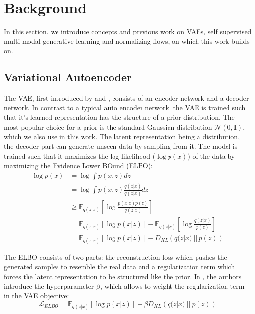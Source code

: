 \section{Background}
In this section, we introduce concepts and previous work on VAEs, self supervised multi modal generative learning and normalizing flows, on which this work builds on.

\subsection{Variational Autoencoder}
The VAE, first introduced by \cite{kingma_auto-encoding_2014} and \cite{rezende_stochastic_2014}, consists of an encoder network and a decoder network.
In contrast to a typical auto encoder network, the VAE is trained such that it's learned representation has the structure of a prior distribution.
The most popular choice for a prior is the standard Gaussian distribution $\mathcal{N}(0,\textbf{I})$, which we also use in this work.
The latent representation being a distribution, the decoder part can generate unseen data by sampling from it.
The model is trained such that it maximizes the log-likelihood ($\log p(x)$) of the data by maximizing the Evidence Lower BOund (ELBO):
\begin{equation}
    \label{vaeelbo}
    \begin{split}
        \log p(x) &= \log \int p(x,z) dz\\
        &=  \log \int p(x,z) \frac{q(z|x)}{q(z|x)}dz\\
        &\geq \mathbb{E} _{q(z|x)}[\log \frac{p(x|z)p(z)}{q(z|x)}]\\
        &= \mathbb{E} _{q(z|x)}[\log p(x|z)] - \mathbb{E} _{q(z|x)}[\log \frac{q(z|x)}{p(z)}]\\
        &= \mathbb{E} _{q(z|x)}[\log p(x|z)] - D_{KL}\left( q(z|x)\ ||\ p(z)\right)
    \end{split}
\end{equation}

The ELBO consists of two parts: the reconstruction loss which pushes the generated samples to resemble the real data and a regularization term which forces the latent representation to be structured like the prior.
In \cite{beta_vae}, the authors introduce the hyperparameter $\beta$, which allows to weight the regularization term in the VAE objective:
\begin{equation}
    \label{eq:vaeelbo}
    \mathcal{L}_{ELBO} = \mathbb{E} _{q(z|x)}[\log p(x|z)] - \beta D_{KL}\left( q(z|x)\ ||\ p(z)\right)
\end{equation}

